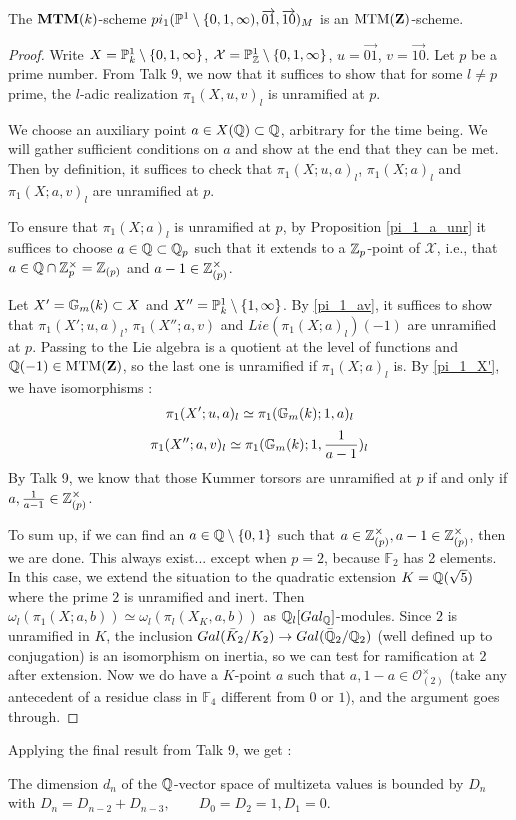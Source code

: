 \begin{prop}
The $\mathbf{MTM}(k)$-scheme $pi_1(\mathbb{P}^1\setminus\{0,1,\infty),\overrightarrow{01},\overrightarrow{10})_M$ is an $\mathrm{MTM}(\mathbf{Z})$-scheme.
\end{prop}

\begin{proof}
Write $X=\mathbb{P}^1_k\setminus\{0,1,\infty\}$, $\mathcal{X}=\mathbb{P}^1_{\mathbb{Z}}\setminus\{0,1,\infty\}$, $u=\overrightarrow{01}$, $v=\overrightarrow{10}$. Let $p$ be a prime number. From Talk 9, we now that it suffices to show that for some $l\neq p$ prime, the $l$-adic realization $\pi_1(X, u,v)_l$ is unramified at $p$. 

We choose an auxiliary point $a\in X(\mathbb{Q})\subset \mathbb{Q}$, arbitrary for the time being. We will gather sufficient conditions on $a$ and show at the end that they can be met. Then by definition, it suffices to check that $\pi_1(X;u,a)_l$, $\pi_1(X;a)_l$ and $\pi_1(X;a,v)_l$ are unramified at $p$. 

To ensure that $\pi_1(X;a)_l$ is unramified at $p$, by Proposition \ref{pi_1_a_unr} it suffices to choose $a\in \mathbb{Q}\subset \mathbb{Q}_p$ such that it extends to a $\mathbb{Z}_p$-point of $\mathcal{X}$, i.e., that $a\in \mathbb{Q}\cap \mathbb{Z}_p^\times=\mathbb{Z}_{(p)}$ and $a-1\in \mathbb{Z}_{(p)}^\times$.

Let $X'=\mathbb{G}_m(k)\subset X$ and $X''=\mathbb{P}^1_k\setminus \{1,\infty\}$. By \ref{pi_1_av}, it suffices to show that $\pi_1(X';u,a)_l$, $\pi_1(X'';a,v)$ and $Lie(\pi_1(X;a)_l)(-1)$ are unramified at $p$. Passing to the Lie algebra is a quotient at the level of functions and $\mathbb{Q}(-1)\in \mathrm{MTM}(\mathbf{Z})$, so the last one is unramified if $\pi_1(X;a)_l$ is. By \ref{pi_1_X'}, we have isomorphisms :
\[
\pi_1(X';u,a)_l\simeq \pi_1(\mathbb{G}_m(k);1,a)_l
\]
\[
\pi_1(X'';a,v)_l\simeq \pi_1(\mathbb{G}_m(k);1,\frac{1}{a-1})_l
\]
By Talk 9, we know that those Kummer torsors are unramified at $p$ if and only if $a,\frac{1}{a-1}\in \mathbb{Z}_{(p)}^{\times}$.

To sum up, if we can find an $a\in \mathbb{Q}\setminus \{0,1\}$ such that $a\in \mathbb{Z}_{(p)}^\times,a-1\in\mathbb{Z}_{(p)}^\times$, then we are done. This always exist... except when $p=2$, because $\mathbb{F}_2$ has 2 elements. In this case, we extend the situation to the quadratic extension $K=\mathbb{Q}(\sqrt{5})$ where the prime $2$ is unramified and inert. Then $\omega_l(\pi_1(X;a,b))\simeq \omega_l(\pi_l(X_K,a,b))$ as $\mathbb{Q}_l[Gal_{\mathbb{Q}}]$-modules. Since $2$ is unramified in $K$, the inclusion $Gal(\bar{K}_2/K_2)\rightarrow Gal(\bar{\mathbb{Q}}_2/\mathbb{Q}_2)$ (well defined up to conjugation) is an isomorphism on inertia, so we can test for ramification at $2$ after extension. Now we do have a $K$-point $a$ such that $a,1-a\in\mathcal{O}_{(2)}^{\times}$ (take any antecedent of a residue class in $\mathbb{F}_4$ different from $0$ or $1$), and the argument goes through.
\end{proof}

Applying the final result from Talk 9, we get :

\begin{thm}
The dimension $d_n$ of the $\mathbb{Q}$-vector space of multizeta values is bounded by $D_n$ with $D_n = D_{n-2} + D_{n-3}, \qquad D_0 = D_2 = 1, D_1 = 0$.
\end{thm}



